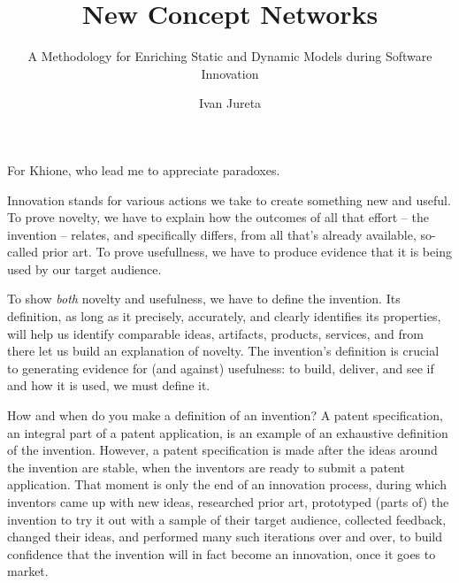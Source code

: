 \documentclass[graybox,envcountchap,sectrefs]{svmono}
\newcommand{\ncnf}{New Concept Network}
\begin{document}
\author{Ivan Jureta}
\title{\ncnf s}
\subtitle{A Methodology for Enriching Static and Dynamic Models during Software Innovation}
\maketitle

\frontmatter

%
\begin{dedication}
For Khione, who lead me to appreciate paradoxes.
\end{dedication}

%

%
\preface
Innovation stands for various actions we take to create something new and useful. To prove novelty, we have to explain how the outcomes of all that effort -- the invention -- relates, and specifically differs, from all that's already available, so-called prior art. To prove usefullness, we have to produce evidence that it is being used by our target audience. 

To show \textit{both} novelty and usefulness, we have to define the invention. Its definition, as long as it precisely, accurately, and clearly identifies its properties, will help us identify comparable ideas, artifacts, products, services, and from there let us build an explanation of novelty. The invention's definition is crucial to generating evidence for (and against) usefulness: to build, deliver, and see if and how it is used, we must define it. 

How and when do you make a definition of an invention? A patent specification, an integral part of a patent application, is an example of an exhaustive definition of the invention. However, a patent specification is made after the ideas around the invention are stable, when the inventors are ready to submit a patent application. That moment is only the end of an innovation process, during which inventors came up with new ideas, researched prior art, prototyped (parts of) the invention to try it out with a sample of their target audience, collected feedback, changed their ideas, and performed many such iterations over and over, to build confidence that the invention will in fact become an innovation, once it goes to market. 
\end{document}

